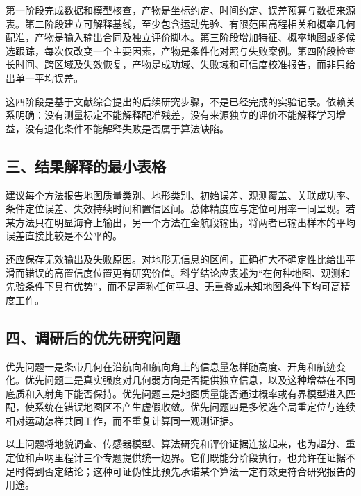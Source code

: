 第一阶段完成数据和模型核查，产物是坐标约定、时间约定、误差预算与数据来源表。第二阶段建立可解释基线，至少包含运动先验、有限范围高程相关和概率几何配准，产物是输入输出合同及独立评价脚本。第三阶段增加特征、概率地图或多候选跟踪，每次仅改变一个主要因素，产物是条件化对照与失败案例。第四阶段检查长时间、跨区域及失效恢复，产物是成功域、失败域和可信度校准报告，而非只给出单一平均误差。

这四阶段是基于文献综合提出的后续研究步骤，不是已经完成的实验记录。依赖关系明确：没有测量标定不能解释配准残差，没有来源独立的评价不能解释学习增益，没有退化条件不能解释失败是否属于算法缺陷。

\hypertarget{ux4e09ux7ed3ux679cux89e3ux91caux7684ux6700ux5c0fux8868ux683c}{%
\subsection{三、结果解释的最小表格}\label{ux4e09ux7ed3ux679cux89e3ux91caux7684ux6700ux5c0fux8868ux683c}}

建议每个方法报告地图质量类别、地形类别、初始误差、观测覆盖、关联成功率、条件定位误差、失效持续时间和置信区间。总体精度应与定位可用率一同呈现。若某方法只在明显海脊上输出，另一个方法在全航段输出，将两者已输出样本的平均误差直接比较是不公平的。

还应保存无效输出及失败原因。对地形无信息的区间，正确扩大不确定性比给出平滑而错误的高置信度位置更有研究价值。科学结论应表述为``在何种地图、观测和先验条件下具有优势''，而不是声称任何平坦、无重叠或未知地图条件下均可高精度工作。

\hypertarget{ux56dbux8c03ux7814ux540eux7684ux4f18ux5148ux7814ux7a76ux95eeux9898}{%
\subsection{四、调研后的优先研究问题}\label{ux56dbux8c03ux7814ux540eux7684ux4f18ux5148ux7814ux7a76ux95eeux9898}}

优先问题一是条带几何在沿航向和航向角上的信息量怎样随高度、开角和航迹变化。优先问题二是真实强度对几何弱方向是否提供独立信息，以及这种增益在不同底质和入射角下能否保持。优先问题三是地图质量能否通过概率或有界模型进入匹配，使系统在错误地图区不产生虚假收敛。优先问题四是多候选全局重定位与连续相对运动怎样共同工作，而不重复计算同一观测证据。

以上问题将地貌调查、传感器模型、算法研究和评价证据连接起来，也为超分、重定位和声呐里程计三个专题提供统一边界。它们既能分阶段执行，也允许在证据不足时得到否定结论；这种可证伪性比预先承诺某个算法一定有效更符合研究报告的用途。

